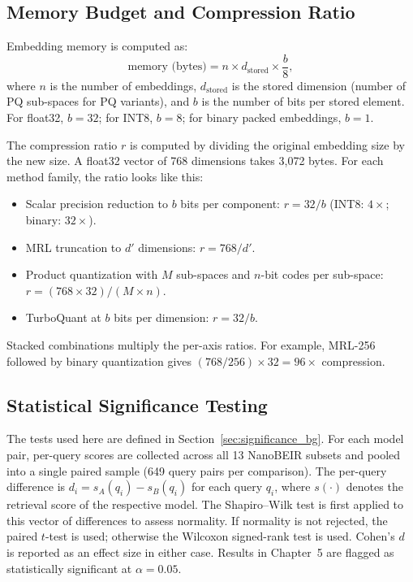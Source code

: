 \subsection{Memory Budget and Compression Ratio}
\label{sec:memory}

Embedding memory is computed as:
%
\begin{equation}
  \text{memory (bytes)} = n \times d_{\text{stored}} \times \frac{b}{8},
  \label{eq:memory}
\end{equation}
%
where $n$ is the number of embeddings, $d_{\text{stored}}$ is the stored
dimension (number of PQ sub-spaces for PQ variants), and $b$ is the number
of bits per stored element. For float32, $b = 32$; for INT8, $b = 8$; for
binary packed embeddings, $b = 1$.

The compression ratio $r$ is computed by dividing the original embedding
size by the new size. A float32 vector of 768 dimensions takes 3{,}072
bytes. For each method family, the ratio looks like this:
%
\begin{itemize}
  \item Scalar precision reduction to $b$ bits per component:
        $r = 32 / b$ (INT8: $4\times$; binary: $32\times$).
  \item MRL truncation to $d'$ dimensions: $r = 768 / d'$.
  \item Product quantization with $M$ sub-spaces and $n$-bit codes per
        sub-space: $r = (768 \times 32) / (M \times n)$.
  \item TurboQuant at $b$ bits per dimension: $r = 32 / b$.
\end{itemize}
%
Stacked combinations multiply the per-axis ratios. For example,
MRL-256 followed by binary quantization gives
$(768/256) \times 32 = 96\times$ compression.

\subsection{Statistical Significance Testing}
\label{sec:significance}

The tests used here are defined in Section~\ref{sec:significance_bg}. For each
model pair, per-query scores are collected across all 13 NanoBEIR subsets
and pooled into a single paired sample (649 query pairs per comparison). The
per-query difference is $d_i = s_A(q_i) - s_B(q_i)$ for each query $q_i$,
where $s(\cdot)$ denotes the retrieval score of the respective model. The Shapiro--Wilk test is first applied to this vector of differences to
assess normality. If normality is not rejected, the paired $t$-test is used;
otherwise the Wilcoxon signed-rank test is used. Cohen's $d$ is reported as
an effect size in either case. Results in Chapter~5 are flagged as
statistically significant at $\alpha = 0.05$.
